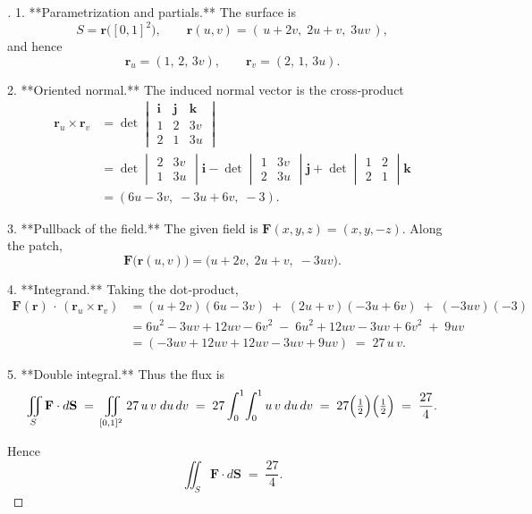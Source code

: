 \documentclass[11pt,openany]{article}
\begin{document}
\begin{proof}[\sol]
1. **Parametrization and partials.**  
The surface is  
\[
S=\mathbf r\bigl([0,1]^2\bigr),
\qquad
\mathbf r(u,v)=(\,u+2v,\;2u+v,\;3uv\,),
\]
and hence
\[
\mathbf r_u=(1,\,2,\,3v),
\qquad
\mathbf r_v=(2,\,1,\,3u).
\]

2. **Oriented normal.**  
The induced normal vector is the cross‐product
\begin{align*}
\mathbf r_u\times \mathbf r_v
&=\det\begin{vmatrix}
	\mathbf i & \mathbf j & \mathbf k\\
	1 & 2 & 3v\\
	2 & 1 & 3u
\end{vmatrix}\\
&=\det\begin{vmatrix}
	2 & 3v \\ 1 & 3u
\end{vmatrix}\textbf{i}-
\det\begin{vmatrix}
	1 & 3v \\ 2 & 3u
\end{vmatrix}\textbf{j}+
\det\begin{vmatrix}
	1 & 2 \\ 2 & 1
\end{vmatrix}\textbf{k}
\\
&=(6u-3v,\;-3u+6v,\;-3).
\end{align*}

3. **Pullback of the field.**  
The given field is \(\mathbf F(x,y,z)=(x,y,-z)\).  Along the patch,
\[
\mathbf F\bigl(\mathbf r(u,v)\bigr)
=\bigl(u+2v,\;2u+v,\;-3uv\bigr).
\]

4. **Integrand.**  
Taking the dot‐product,
\begin{align*}
	\mathbf F(\mathbf r)\,\cdot\,(\mathbf r_u\times\mathbf r_v)
	&= (u+2v)(6u-3v)\;+\;(2u+v)(-3u+6v)\;+\;(-3uv)(-3)\\
	&= 6u^2 -3uv +12uv -6v^2 \;-\;6u^2 +12uv -3uv +6v^2 \;+\;9uv\\
	&=(-3uv+12uv+12uv-3uv+9uv)\;=\;27\,u\,v.
\end{align*}

5. **Double integral.**  
Thus the flux is
\[
\iint_{S}\mathbf F\cdot d\mathbf S
\;=\;
\iint_{[0,1]^2}27\,u\,v\;du\,dv
\;=\;
27\int_0^1\!\int_0^1 u\,v\;du\,dv
\;=\;
27\Bigl(\tfrac12\Bigr)\Bigl(\tfrac12\Bigr)
\;=\;\frac{27}{4}.
\]

Hence  
\[
\boxed{\iint_{S}\mathbf F\cdot d\mathbf S \;=\;\frac{27}{4}}.
\]
\end{proof}

\end{document}
